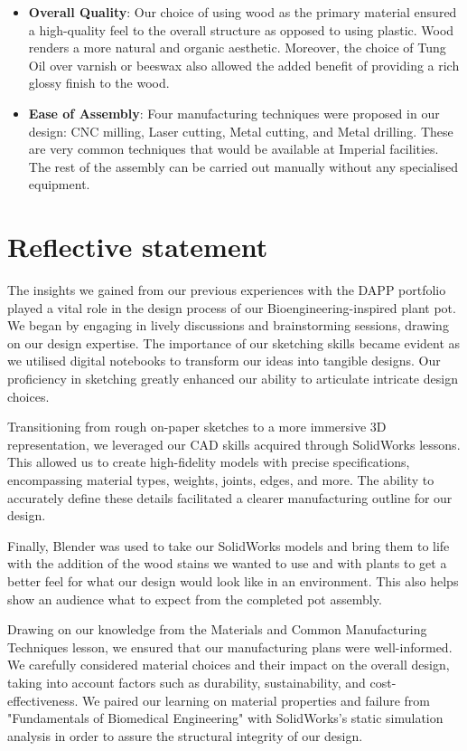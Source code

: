 \documentclass[12pt]{extarticle} %
\begin{document}
\begin{itemize}
\item \textbf{Overall Quality}: Our choice of using wood as the primary material ensured a high-quality feel to the overall structure as opposed to using plastic. Wood renders a more natural and organic aesthetic.  Moreover, the choice of Tung Oil over varnish or beeswax also allowed the added benefit of providing a rich glossy finish to the wood. 
\item \textbf{Ease of Assembly}: Four manufacturing techniques were proposed in our design: CNC milling, Laser cutting, Metal cutting, and Metal drilling. These are very common techniques that would be available at Imperial facilities. The rest of the assembly can be carried out manually without any specialised equipment.
\end{itemize}

\pagebreak
\section{Reflective statement}
The insights we gained from our previous experiences with the DAPP portfolio played a vital role in the design process of our Bioengineering-inspired plant pot. We began by engaging in lively discussions and brainstorming sessions, drawing on our design expertise. The importance of our sketching skills became evident as we utilised digital notebooks to transform our ideas into tangible designs. Our proficiency in sketching greatly enhanced our ability to articulate intricate design choices. 
 
Transitioning from rough on-paper sketches to a more immersive 3D representation, we leveraged our CAD skills acquired through SolidWorks lessons. This allowed us to create high-fidelity models with precise specifications, encompassing material types, weights, joints, edges, and more. The ability to accurately define these details facilitated a clearer manufacturing outline for our design.

Finally, Blender was used to take our SolidWorks models and bring them to life with the addition of the wood stains we wanted to use and with plants to get a better feel for what our design would look like in an environment. This also helps show an audience what to expect from the completed pot assembly.
 
Drawing on our knowledge from the Materials and Common Manufacturing Techniques lesson, we ensured that our manufacturing plans were well-informed. We carefully considered material choices and their impact on the overall design, taking into account factors such as durability, sustainability, and cost-effectiveness. We paired our learning on material properties and failure from "Fundamentals of Biomedical Engineering" with SolidWorks's static simulation analysis in order to assure the structural integrity of our design.
\end{document}
